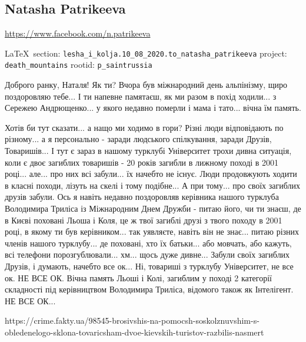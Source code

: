  
 
\subsection{Natasha Patrikeeva}
\url{https://www.facebook.com/n.patrikeeva}
  
\vspace{0.5cm}
 {\ifDEBUG\small\LaTeX~section: \verb|lesha_i_kolja.10_08_2020.to_natasha_patrikeeva| project: \verb|death_mountains| rootid: \verb|p_saintrussia| \fi}
\vspace{0.5cm}

Доброго ранку, Наталя! Як ти? Вчора був міжнародний день альпінізму, щиро
поздоровляю тебе... І ти напевне памятаєш, як ми разом в похід ходили... з
Сережею Андрющенко...  у якого недавно померли і мама і тато... вічна їм
память.

Хотів би тут сказати... а нащо ми ходимо в гори? Різні люди відповідають по
різному... а я персонально - заради людського спілкування, заради Друзів,
Товаришів... І тут є зараз в нашому турклубі Університет трохи дивна ситуація,
коли є двоє загиблих товаришів - 20 років загибли в лижному поході в 2001
році... але... про них всі забули... їх начебто не існує. Люди продовжують
ходити в класні походи, лізуть на скелі і тому подібне... А при тому... про
своїх загиблих друзів забули. Ось я навіть недавно поздоровляв керівника нашого
турклуба Володимира Триліса із Міжнародним Днем Дружби - питаю його, чи ти
знаєш, де в Києві поховані Льоша і Коля, це ж твої загиблі друзі з твого походу
в 2001 році, в якому ти був керівником... так уявляєте, навіть він не знає...
питаю різних членів нашого турклубу... де поховані, хто їх батьки... або
мовчать, або кажуть, всі телефони порозгублювали... хм... щось дуже дивне...
Забули своїх загиблих Друзів, і думають, начебто все ок... Ні, товариші з
турклубу Університет, не все ок. НЕ ВСЕ ОК. Вічна память Льоші і Колі, загиблим
у поході 2 категорії складності під керівництвом Володимира Триліса, відомого
також як Інтелігент. НЕ ВСЕ ОК...

https://crime.fakty.ua/98545-brosivshis-na-pomocsh-soskolznuvshim-s-obledenelogo-sklona-tovaricsham-dvoe-kievskih-turistov-razbilis-nasmert


  

